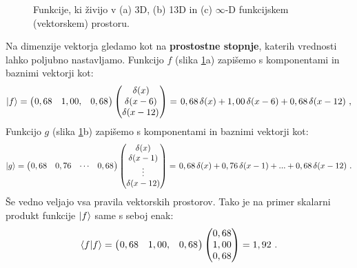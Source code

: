 \begin{figure}[ht]
\begin{subfigure}[b]{0.32\textwidth}
      \caption{}
   \end{subfigure}
   \caption{Funkcije, ki živijo v (a) 3D, (b) 13D in (c) $\infty$-D funkcijskem (vektorskem) prostoru.}
   \label{fig:discreteExample}
\end{figure}

Na dimenzije vektorja gledamo kot na \textbf{prostostne stopnje}, katerih vrednosti lahko poljubno nastavljamo. Funkcijo $f$ (slika \ref{fig:discreteExample}a) zapišemo s komponentami in baznimi vektorji kot:
\begin{equation}
   \ket{f} =
   \begin{pmatrix}
      \mkern1mu 0,68 & 1,00, & 0,68 \mkern1mu
   \end{pmatrix}
   \begin{pmatrix}
      \mkern1mu \delta(x) \\
      \delta(x-6)         \\
      \delta(x-12) \mkern1mu
   \end{pmatrix}
   =
   \mkern2mu 0,68 \, \delta(x) + 1,00 \, \delta(x-6) + 0,68 \, \delta(x-12)
   \ ,
   \label{eq:discreteF}
\end{equation}
Funkcijo $g$ (slika \ref{fig:discreteExample}b) zapišemo s komponentami in baznimi vektorji kot:
\begin{equation}
   \ket{g} =
   \begin{pmatrix}
      \mkern1mu 0,68 & 0,76 & \cdots & 0,68 \mkern1mu
   \end{pmatrix}
   \begin{pmatrix}
      \delta(x)   \\
      \delta(x-1) \\
      \vdots      \\
      \delta(x-12)
   \end{pmatrix}
   =
   \mkern2mu 0,68 \, \delta(x) + 0,76 \, \delta(x-1) + ... + 0,68 \, \delta(x-12)
   \ .
   \label{eq:discreteG}
\end{equation}
Še vedno veljajo vsa pravila vektorskih prostorov. Tako je na primer skalarni produkt funkcije $\ket{f}$ same s seboj enak:
\begin{equation}
   \bra{f}\ket{f} =
   \begin{pmatrix}
      \mkern1mu 0,68 & 1,00, & 0,68 \mkern1mu
   \end{pmatrix}
   \begin{pmatrix}
      0,68 \\
      1,00 \\
      0,68
   \end{pmatrix}
   =
   1,92 \ .
\end{equation}
